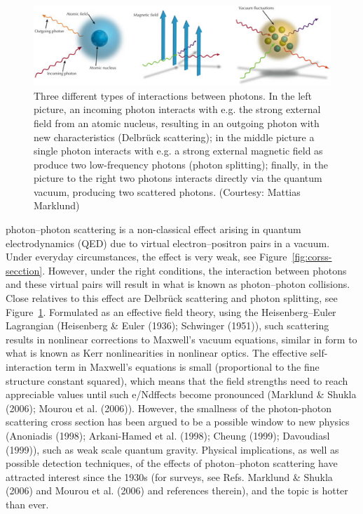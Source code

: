 \documentclass{paper}
\begin{document}
\begin{figure}[!th]
	\centering
	\includegraphics[width=\linewidth]{figures/photons.jpg}
	\caption{Three different types of interactions between photons. In the left picture, an incoming photon interacts with e.g. the strong external field from an atomic nucleus, resulting in an outgoing photon with new characteristics (Delbrück scattering); in the middle picture a single photon interacts with e.g. a strong external magnetic field as produce two low-frequency photons (photon splitting); finally, in the picture to the right two photons interacts directly via the quantum vacuum, producing two scattered photons. (Courtesy: Mattias Marklund)}
	\label{fig:photon-types}
\end{figure}
photon–photon scattering is a non-classical effect arising in quantum electrodynamics (QED) due to virtual electron–positron pairs in a vacuum. Under everyday circumstances, the effect is very weak, see Figure~\ref{fig:corss-secction}. However, under the right conditions, the interaction between photons and these virtual pairs will result in what is known as photon–photon collisions. Close relatives to this effect are Delbrück scattering and photon splitting, see Figure~\ref{fig:photon-types}. Formulated as an effective field theory, using the Heisenberg–Euler Lagrangian (Heisenberg \& Euler (1936); Schwinger (1951)), such scattering results in nonlinear corrections to Maxwell’s vacuum equations, similar in form to what is known as Kerr nonlinearities in nonlinear optics.
The effective self-interaction term in Maxwell’s equations is small (proportional to the fine structure constant squared), which means that the field strengths need to reach appreciable values until such e/Ndffects become pronounced (Marklund \& Shukla (2006); Mourou et al. (2006)). However, the smallness of the photon-photon scattering cross section has been argued to be a possible window to new physics (Anoniadis (1998); Arkani-Hamed et al. (1998); Cheung (1999); Davoudiasl (1999)), such as weak scale quantum gravity. Physical implications, as well as possible detection techniques, of the effects of photon–photon scattering have attracted interest since the 1930s (for surveys, see Refs. Marklund \& Shukla (2006) and Mourou et al. (2006) and references therein), and the topic is hotter than ever.
\end{document}
